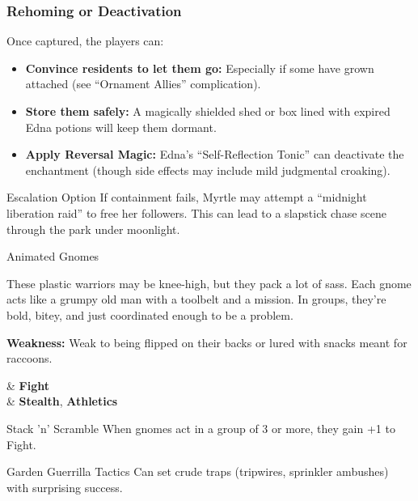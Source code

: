 \begin{multicols}{2}
\subsubsection{Rehoming or Deactivation}
Once captured, the players can:
\begin{itemize}
    \item \textbf{Convince residents to let them go:} Especially if some have grown attached (see “Ornament Allies” complication).
    \item \textbf{Store them safely:} A magically shielded shed or box lined with expired Edna potions will keep them dormant.
    \item \textbf{Apply Reversal Magic:} Edna’s “Self-Reflection Tonic” can deactivate the enchantment (though side effects may include mild judgmental croaking).
\end{itemize}

\begin{CommentBox}{Escalation Option}
If containment fails, Myrtle may attempt a “midnight liberation raid” to free her followers. This can lead to a slapstick chase scene through the park under moonlight.
\end{CommentBox}

\begin{NPC}[description={Grumpy, Stabby, Collectible}]{Animated Gnomes}

    These plastic warriors may be knee-high, but they pack a lot of sass. Each gnome acts like a grumpy old man with a toolbelt and a mission. In groups, they’re bold, bitey, and just coordinated enough to be a problem.

    \textbf{Weakness:} Weak to being flipped on their backs or lured with snacks meant for raccoons.

    \vspace{0.5\baselineskip}
    \begin{SkillsBox}
        \Skilled & \textbf{Fight} \\
        \Novice  & \textbf{Stealth}, \textbf{Athletics}
    \end{SkillsBox}

    \begin{TraitsBox}
        \item[Stack 'n' Scramble] When gnomes act in a group of 3 or more, they gain +1 to Fight.
        \item[Garden Guerrilla Tactics] Can set crude traps (tripwires, sprinkler ambushes) with surprising success.
    \end{TraitsBox}


\end{NPC}
\end{multicols}
